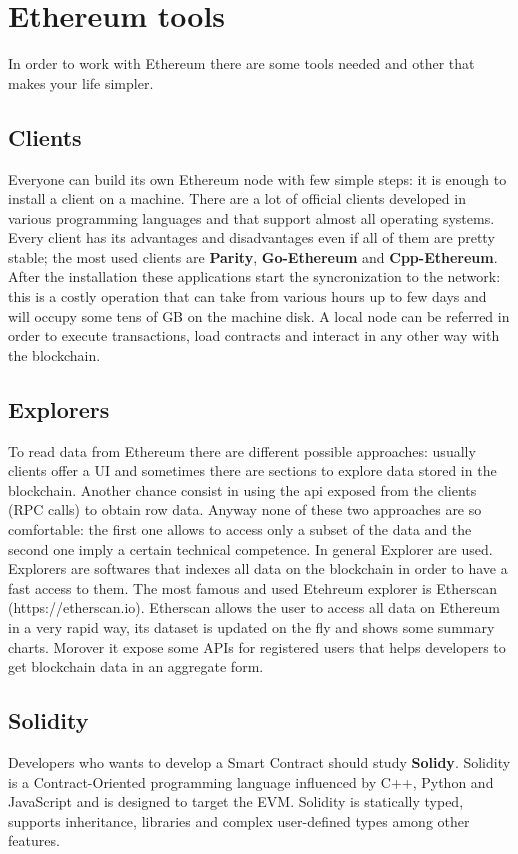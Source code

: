\section{Ethereum tools}
\label{blockchain:ethereum_tools}
In order to work with Ethereum there are some tools needed and other that makes your life simpler.

\subsection{Clients}
Everyone can build its own Ethereum node with few simple steps: it is enough to install a client on a machine. There are a lot 
of official clients developed in various programming languages and that support almost all operating systems. Every client 
has its advantages and disadvantages even if all of them are pretty stable; the most used clients are \textbf{Parity}, 
\textbf{Go-Ethereum} and \textbf{Cpp-Ethereum}. After the installation these applications start the syncronization to the 
network: this is a costly operation that can take from various hours up to few days and will occupy some tens of GB on the 
machine disk. A local node can be referred in order to execute transactions, load contracts and interact in any other way with 
the blockchain.

\subsection{Explorers}
To read data from Ethereum there are different possible approaches: usually clients offer a UI and sometimes there are sections 
to explore data stored in the blockchain. Another chance consist in using the api exposed from the clients (RPC calls) to 
obtain row data. Anyway none of these two approaches are so comfortable: the first one allows to access only a subset of the 
data and the second one imply a certain technical competence. In general Explorer are used. Explorers are softwares that 
indexes all data on the blockchain in order to have a fast access to them. The most famous and used Etehreum explorer is 
Etherscan (https://etherscan.io). Etherscan allows the user to access all data on Ethereum in a very rapid way, its dataset is 
updated on the fly and shows some summary charts. Morover it expose some APIs for registered users that helps developers to 
get blockchain data in an aggregate form.

\subsection{Solidity}
Developers who wants to develop a Smart Contract should study \textbf{Solidy}. Solidity is a Contract-Oriented programming 
language influenced by C++, Python and JavaScript and is designed to target the EVM. Solidity is statically typed, supports 
inheritance, libraries and complex user-defined types among other features.

